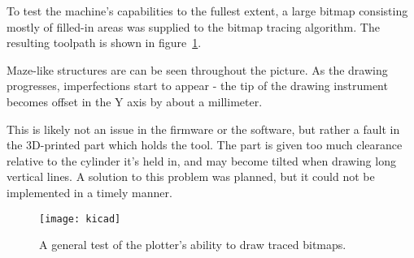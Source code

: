 To test the machine's capabilities to the fullest extent, a large bitmap
consisting mostly of filled-in areas was supplied to the bitmap tracing
algorithm. The resulting toolpath is shown in figure~\ref{kicad}.

Maze-like structures are can be seen throughout the picture. As the drawing
progresses, imperfections start to appear - the tip of the drawing instrument
becomes offset in the Y axis by about a millimeter.

This is likely not an issue in the firmware or the software, but rather a fault
in the 3D-printed part which holds the tool. The part is given too much
clearance relative to the cylinder it's held in, and may become tilted when
drawing long vertical lines. A solution to this problem was planned, but it
could not be implemented in a timely manner.

\begin{figure}[ht]
    \begin{center}
        \texttt{[image: kicad]}
        \caption{A general test of the plotter's ability to draw traced
        bitmaps.}
        \label{kicad}
    \end{center}
\end{figure}
